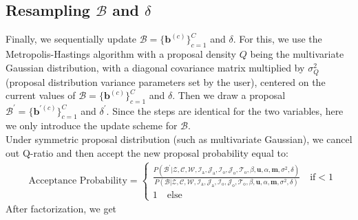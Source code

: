 \documentclass[a4paper]{article}
\begin{document}
 \subsection{Resampling $\mathcal{B}$ and $\delta$}  \label{subsec: Resampling B}
 Finally, we sequentially update $\mathcal{B}=\{\boldsymbol{b}^{(c)}\}_{c=1}^C$ and $\delta$. For this, we use the Metropolis-Hastings algorithm with a proposal density $Q$ being the multivariate Gaussian distribution, with a diagonal covariance matrix multiplied by $\sigma^2_Q$ (proposal distribution variance parameters set by the user), centered on the current values of $\mathcal{B}=\{\boldsymbol{b}^{(c)}\}_{c=1}^C$ and $\delta$. Then we draw a proposal $\mathcal{B}^\prime=\{\boldsymbol{b}^{\prime(c)}\}_{c=1}^C$ and $\delta^\prime$. Since the steps are identical for the two variables, here we only introduce the update scheme for $\mathcal{B}$.\\ \newline Under symmetric proposal distribution (such as multivariate Gaussian), we cancel out Q-ratio and then accept the new proposal probability equal to:
 \begin{equation}
 \begin{split}
 & \mbox{Acceptance Probability}=
 \begin{cases}  \frac{P(\mathcal{B}^\prime|\mathcal{Z},   \mathcal{C},  \mathcal{W}, \mathcal{I}_{\mbox{a}}, \mathcal{J}_{\mbox{a}}, \mathcal{I}_{\mbox{o}}, \mathcal{J}_{\mbox{o}}, \mathcal{T}_{\mbox{o}}, \beta, \boldsymbol{u}, \alpha, \boldsymbol{m}, \sigma^2, \delta)}{P(\mathcal{B}|\mathcal{Z},   \mathcal{C},  \mathcal{W}, \mathcal{I}_{\mbox{a}}, \mathcal{J}_{\mbox{a}}, \mathcal{I}_{\mbox{o}}, \mathcal{J}_{\mbox{o}}, \mathcal{T}_{\mbox{o}}, \beta, \boldsymbol{u}, \alpha, \boldsymbol{m}, \sigma^2,   \delta)}\quad\text{if}  <1\\
 1 \quad \text{else}
 \end{cases}
 \end{split}
 \end{equation}
 After factorization, we get
\end{document}
